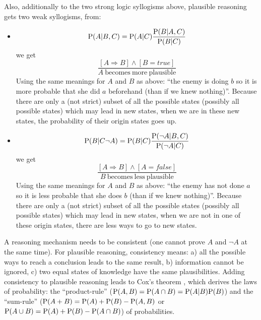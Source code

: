 Also, additionally to the two strong logic syllogisms above, plausible reasoning gets two weak syllogisms, from:
\begin{itemize}
    \item $$\mathrm{P}(A|B,C)=\mathrm{P}(A|C)\frac{\mathrm{P}(B|A,C)}{\mathrm{P}(B|C)}$$ we get $$\frac{[A\Rightarrow B] \wedge [B=true]}{A\ \mathrm{becomes\ more\ plausible}}$$
    Using the same meanings for $A$ and $B$ as above: ``the enemy is doing $b$ so it is more probable that she did $a$ beforehand (than if we knew nothing)''. Because there are only a (not strict) subset of all the possible states (possibly all possible states) which may lead in new states, when we are in these new states, the probability of their origin states goes up.
    \item $$\mathrm{P}(B| C\neg A)=\mathrm{P}(B|C)\frac{\mathrm{P}(\neg A|B,C)}{\mathrm{P}(\neg A|C)}$$ we get $$\frac{[A\Rightarrow B] \wedge [A=false]}{B\ \mathrm{becomes\ less\ plausible}}$$
    Using the same meanings for $A$ and $B$ as above: ``the enemy has not done $a$ so it is less probable that she does $b$ (than if we knew nothing)''. Because there are only a (not strict) subset of all the possible states (possibly all possible states) which may lead in new states, when we are not in one of these origin states, there are less ways to go to new states.
\end{itemize}

A reasoning mechanism needs to be consistent (one cannot prove $A$ and $\neg A$ at the same time). For plausible reasoning, consistency means: a) all the possible ways to reach a conclusion leads to the same result, b) information cannot be ignored, c) two equal states of knowledge have the same plausibilities. Adding consistency to plausible reasoning leads to Cox's theorem \citep{Cox46}, which derives the laws of probability: the ``product-rule'' ($\mathrm{P}(A,B)=\mathrm{P}(A\cap B)=\mathrm{P}(A|B)\mathrm{P}(B)$) and the ``sum-rule'' ($\mathrm{P}(A+B)=\mathrm{P}(A)+\mathrm{P}(B)-\mathrm{P}(A,B)$ or $\mathrm{P}(A\cup B) = \mathrm{P}(A)+\mathrm{P}(B)-\mathrm{P}(A\cap B)$) of probabilities. 

